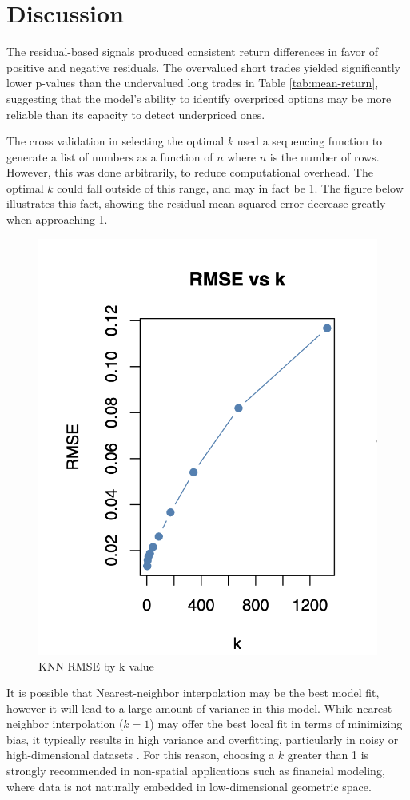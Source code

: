 \documentclass{article}
\begin{document}
\section{Discussion}

The residual-based signals produced consistent return differences in favor of positive and negative residuals. The overvalued short trades yielded significantly lower p-values than the undervalued long trades in Table \ref{tab:mean-return}, suggesting that the model's ability to identify overpriced options may be more reliable than its capacity to detect underpriced ones.

The cross validation in selecting the optimal $k$ used a sequencing function to generate a list of numbers as a function of $n$ where $n$ is the number of rows. However, this was done arbitrarily, to reduce computational overhead. The optimal $k$ could fall outside of this range, and may in fact be 1. The figure below illustrates this fact, showing the residual mean squared error decrease greatly when approaching 1.

\begin{figure}[h]
  \centering
  \includegraphics[width=0.8\linewidth]{data/results/knn_rmse.png}
  \caption{KNN RMSE by k value}
  \label{fig:knn-rmse}
\end{figure}

It is possible that Nearest-neighbor interpolation may be the best model fit, however it will lead to a large amount of variance in this model. While nearest-neighbor interpolation (\( k = 1 \)) may offer the best local fit in terms of minimizing bias, it typically results in high variance and overfitting, particularly in noisy or high-dimensional datasets \cite{caruana2006empirical}. For this reason, choosing a $k$ greater than 1 is strongly recommended in non-spatial applications such as financial modeling, where data is not naturally embedded in low-dimensional geometric space.
\end{document}
